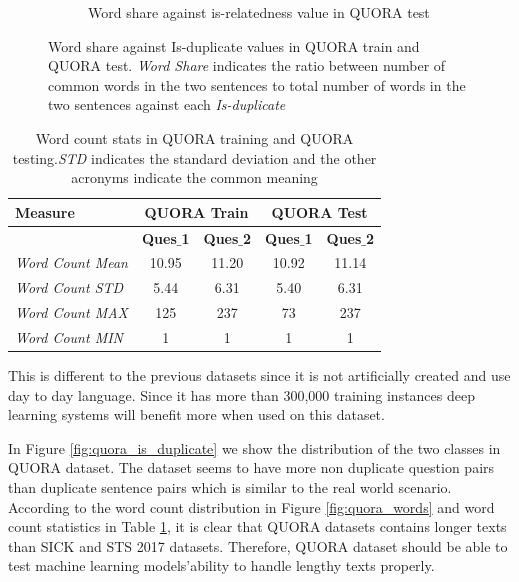 \begin{enumerate}
\begin{figure}
\begin{subfigure}[b]{.5\textwidth}
		\caption{Word share against is-relatedness value in QUORA test}
		\label{fig:quora_test_word_share}
	\end{subfigure}
	\caption[Word share against Is-duplicate values in QUORA train and QUORA test.]{Word share against Is-duplicate values in QUORA train and QUORA test. \textit{Word Share} indicates the ratio between number of common words in the two sentences to total number of words in the two sentences against each \textit{Is-duplicate}}
	\label{fig:quora_word_share}
\end{figure}


\begin{table}
	\centering
	\begin{tabular}{l|cc|cc}
		\hline
		Measure   & \multicolumn{2}{c|}{QUORA Train} & \multicolumn{2}{c}{QUORA Test} \\
		\hline
		\multicolumn{1}{l|}{} & \textbf{Ques$\_$1} & \textbf{Ques$\_$2} & \textbf{Ques$\_$1} & \textbf{Ques$\_$2} \\
		\textit{Word Count Mean} & 10.95 & 11.20 & 10.92 & 11.14  \\
		\textit{Word Count STD} & 5.44 & 6.31 & 5.40 & 6.31  \\
		\textit{Word Count MAX} & 125 & 237 & 73 & 237  \\
		\textit{Word Count MIN} & 1 & 1 & 1 & 1  \\
		\hline
	\end{tabular}
	\caption[Word count stats in QUORA]{Word count stats in QUORA training and QUORA testing.\textit{STD} indicates the standard deviation and the other acronyms indicate the common meaning }
	\label{table:quora_sts}
\end{table}
 
  
This is different to the previous datasets since it is not artificially created and use day to day language. Since it has more than 300,000 training instances deep learning systems will benefit more when used on this dataset. 

In Figure \ref{fig:quora_is_duplicate} we show the distribution of the two classes in QUORA dataset. The dataset seems to have more non duplicate question pairs than duplicate sentence pairs which is similar to the real world scenario. According to the word count distribution in Figure \ref{fig:quora_words} and word count statistics in Table \ref{table:quora_sts}, it is clear that QUORA datasets contains longer texts than SICK and STS 2017 datasets. Therefore, QUORA dataset should be able to test machine learning models'ability to handle lengthy texts properly. 


\end{enumerate}
